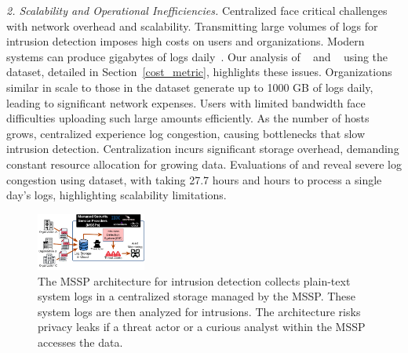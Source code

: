     
\smallskip
\noindent
\textit{2. Scalability and Operational Inefficiencies.}  Centralized \pids face critical challenges with network overhead and scalability. Transmitting large volumes of logs for intrusion detection imposes high costs on users and organizations. Modern systems can produce gigabytes of logs daily~\cite{inam2023sok,hossain+depend}. Our analysis of \flash~\cite{flash2024} and \kairos~\cite{cheng2023kairos} using the \optc dataset, detailed in Section~\ref{cost_metric}, highlights these issues. Organizations similar in scale to those in the \optc dataset generate up to 1000 GB of logs daily, leading to significant network expenses. Users with limited bandwidth face difficulties uploading such large amounts efficiently. As the number of hosts grows, centralized \pids experience log congestion, causing bottlenecks that slow intrusion detection. Centralization incurs significant storage overhead, demanding constant resource allocation for growing data. Evaluations of \flash and \kairos reveal severe log congestion using \optc dataset, with \flash taking 27.7 hours and  hours to process a single day's logs, highlighting scalability limitations.


\begin{figure}[t!]
  \centering
  \includegraphics[width=0.32\textwidth]{fig/mssp.pdf}
  \caption{The MSSP architecture for intrusion detection collects plain-text system logs in a centralized storage managed by the MSSP. These system logs are then analyzed for intrusions. The architecture risks privacy leaks if a threat actor or a curious analyst within the MSSP accesses the data. }
  \label{mssp}
  \vspace{-4ex}
\end{figure}

\smallskip
{}
\smallskip

